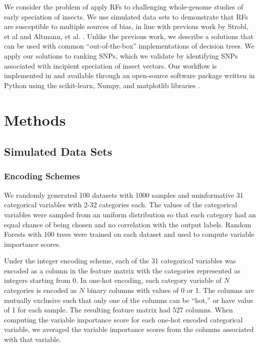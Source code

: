 We consider the problem of apply RFs to challenging whole-genome studies of early speciation of insects. We use simulated data sets to demonstrate that RFs are susceptible to multiple sources of bias, in line with previous work by Strobl, et al \cite{Strobl2007, Strobl2008, Nicodemus2010} and Altmann, et al. \cite{Altmann2010}. Unlike the previous work, we describe a solutions that can be used with common ``out-of-the-box'' implementations of decision trees. We apply our solutions to ranking SNPs, which we validate by identifying SNPs associated with incipient speciation of insect vectors.  Our workflow is implemented in and available through an open-source software package written in Python using the scikit-learn, Numpy, and matplotlib libraries \cite{scikit-learn, Stefan2011,Hunter2007}.


\section{Methods}
\subsection{Simulated Data Sets}
\subsubsection{Encoding Schemes}
We randomly generated 100 datasets with 1000 samples and uninformative 31 categorical variables with 2-32 categories each.  The values of the categorical variables were sampled from an uniform distribution so that each category had an equal chance of being chosen and no correlation with the output labels. Random Forests with 100 trees were trained on each dataset and used to compute variable importance scores.

Under the integer encoding scheme, each of the 31 categorical variables was encoded as a column in the feature matrix with the categories represented as integers starting from 0.  In one-hot encoding, each category variable of $N$ categories is encoded as $N$ binary columns with values of 0 or 1.  The columns are mutually exclusive such that only one of the columns can be ``hot,'' or have value of 1 for each sample.  The resulting feature matrix had 527 columns.  When computing the variable importance score for each one-hot encoded categorical variable, we averaged the variable importance scores from the columns associated with that variable.

